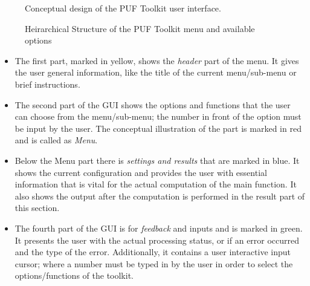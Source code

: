 \begin{figure}
\centering
{}
\caption{Conceptual design of the PUF Toolkit user interface.}
\label{img:gui_design}
\end{figure}

\begin{figure}
\centering
{}

\caption{Heirarchical Structure of the PUF Toolkit menu and available options}
\label{img:puf_menu}
\end{figure}

\begin{itemize}
	\item The first part, marked in yellow, shows the \emph{header} part of the menu. It gives the user general information, like the title of the current menu/sub-menu or brief instructions.
	\item The second part of the GUI shows the options and functions that the user can choose from the menu/sub-menu; the number in front of the option must be input by the user. The conceptual illustration of the part is marked in red and is called as \emph{Menu}.
	\item Below the Menu part there is \emph{settings and results} that are marked in blue. It shows the current configuration and provides the user with essential information that is vital for the actual computation of the main function. It also shows the output after the computation is performed in the result part of this section.
	\item The fourth part of the GUI is for \emph{feedback} and inputs and is marked in green. It presents the user with the actual processing status, or if an error occurred and the type of the error. Additionally, it contains a user interactive input cursor; where a number must be typed in by the user in order to select the options/functions of the toolkit.
\end{itemize}


